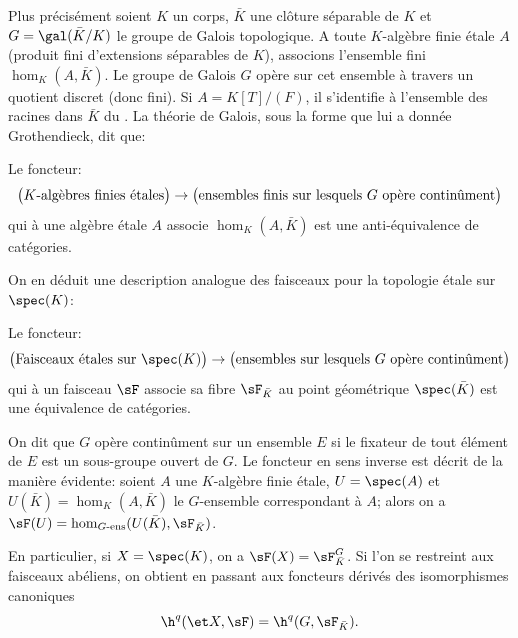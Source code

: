 \subsubsection{}\label{I:2-4-2}

Plus précisément soient $K$ un corps, $\bar K$ une clôture séparable de $K$ et 
$G = \gal(\bar K/K)$ le groupe de Galois topologique. A toute $K$-algèbre finie 
étale $A$ (produit fini d'extensions séparables de $K$), associons l'ensemble 
fini $\hom_K(A,\bar K)$. Le groupe de Galois $G$ opère sur cet ensemble à 
travers un quotient discret (donc fini). Si $A=K[T]/(F)$, il s'identifie à 
l'ensemble des racines dans $\bar K$ du . La théorie de Galois, 
sous la forme que lui a donnée Grothendieck, dit que:





\begin{propositiondotdash}\label{I:2-4-3}
Le foncteur:
\[
  \bigl(\textnormal{$K$-algèbres finies étales}\bigr)
  \to
  \bigl(\textnormal{ensembles finis sur lesquels $G$ opère continûment}\bigr)
\]
qui à une algèbre étale $A$ associe $\hom_K(A,\bar K)$ est une 
anti-équivalence de catégories.
\end{propositiondotdash}

On en déduit une description analogue des faisceaux pour la topologie étale sur 
$\spec(K)$:





\begin{propositiondotdash}\label{I:2-4-4}
Le foncteur:
\[
  \bigl(\textnormal{Faisceaux étales sur $\spec(K)$}\bigr)
  \to
  \bigl(\textnormal{ensembles sur lesquels $G$ opère continûment}\bigr)
\]
qui à un 
faisceau $\sF$ associe sa fibre $\sF_{\bar K}$ au point géométrique 
$\spec(\bar K)$ est une équivalence de catégories.
\end{propositiondotdash}

On dit que $G$ opère continûment sur un ensemble $E$ si le fixateur de tout 
élément de $E$ est un sous-groupe ouvert de $G$. Le foncteur en sens 
inverse est décrit de la manière évidente: soient $A$ une 
$K$-algèbre finie étale, $U=\spec(A)$ et $U(\bar K)=\hom_K(A,\bar K)$ le 
$G$-ensemble correspondant à $A$; alors on a 
$\sF(U)= \hom_{G\text{-ens}}(U(\bar K),\sF_{\bar K})$. 

En particulier, si $X=\spec(K)$, on a $\sF(X) = \sF_{\bar K}^G$. Si l'on se 
restreint aux faisceaux abéliens, on obtient en passant aux foncteurs 
dérivés des isomorphismes canoniques 
\[
  \h^q(\et X,\sF) = \h^q(G,\sF_{\bar K})\text{.}
\]





